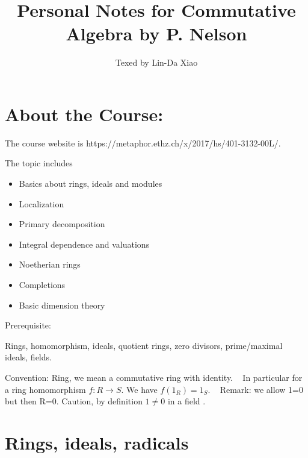 \documentclass[11pt]{article}
\title{\bf Personal Notes for Commutative Algebra by P. Nelson}
\author{Texed by Lin-Da Xiao} %
\begin{document}
\maketitle
\tableofcontents
\newpage
\section*{About the Course:}
The course website is https://metaphor.ethz.ch/x/2017/hs/401-3132-00L/. 

The topic includes
\begin{itemize}
\item 
Basics about rings, ideals and modules
\item 
Localization
\item 
Primary decomposition
\item 
Integral dependence and valuations
\item 
Noetherian rings
\item 
Completions
\item 
Basic dimension theory
\end{itemize}

Prerequisite:

Rings, homomorphism, ideals, quotient rings, zero divisors, prime/maximal ideals, fields.

Convention: 
Ring, we mean a commutative ring with identity.
 
In particular for a ring homomorphism $f:R\rightarrow S$. We have $f(1_R)=1_S$.
 
Remark:
we allow 1=0 but then R=0.
Caution, by definition $1\neq 0$ in a field .
\section{Rings, ideals, radicals}
\end{document}
